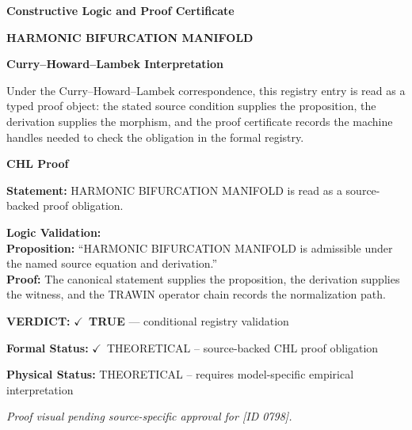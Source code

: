 \clearpage
\begingroup\tzpsupportsetup
\noindent\textbf{\fontsize{10.8pt}{12.8pt}\selectfont [ID 0798] Constructive Logic and Proof Certificate}\par
\noindent\textbf{\fontsize{10pt}{12pt}\selectfont HARMONIC BIFURCATION MANIFOLD}\par
\vspace{0.45em}
\begingroup
\footnotesize
\setlength{\parskip}{0.22em}
\setlength{\parindent}{0pt}
\noindent\textbf{Curry--Howard--Lambek Interpretation}\par
Under the Curry--Howard--Lambek correspondence, this registry entry is read as a typed proof
object: the stated source condition supplies the proposition, the derivation supplies the
morphism, and the proof certificate records the machine handles needed to check the obligation
in the formal registry.

\vspace{0.45em}
\noindent\textbf{CHL Proof}\par
\textbf{Statement:} HARMONIC BIFURCATION MANIFOLD is read as a source-backed proof obligation.

\textbf{Logic Validation:}\\
\textbf{Proposition:} ``HARMONIC BIFURCATION MANIFOLD is admissible under the named source equation and derivation.''\\
\textbf{Proof:} The canonical statement supplies the proposition, the derivation supplies the witness, and the TRAWIN operator chain records the normalization path.

\textbf{VERDICT:} \ensuremath{\checkmark}\ \textbf{TRUE} --- conditional registry validation

\textbf{Formal Status:} \ensuremath{\checkmark}\ THEORETICAL -- source-backed CHL proof obligation

\textbf{Physical Status:} THEORETICAL -- requires model-specific empirical interpretation
\par\vspace{0.45em}
\par
\vfill
\begingroup\footnotesize\itshape
Proof visual pending source-specific approval for [ID 0798].
\par\endgroup
\vfill
\endgroup
\endgroup
